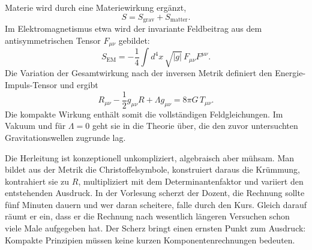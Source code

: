 Materie wird durch eine Materiewirkung ergänzt,
\begin{equation}
 S=S_{\mathrm{grav}}+S_{\mathrm{matter}}.
\end{equation}
Im Elektromagnetismus etwa wird der invariante Feldbeitrag aus dem antisymmetrischen Tensor \(F_{\mu\nu}\) gebildet:
\begin{equation}
 S_{\mathrm{EM}}
 =-\frac14
 \int d^4x\,\sqrt{|g|}\,
 F_{\mu\nu}F^{\mu\nu}.
\end{equation}
Die Variation der Gesamtwirkung nach der inversen Metrik definiert den Energie-Impuls-Tensor und ergibt
\begin{equation}
 R_{\mu\nu}
 -\frac12 g_{\mu\nu}R
 +\Lambda g_{\mu\nu}
 =8\pi G\,T_{\mu\nu}.
 \label{eq:einstein-from-action}
\end{equation}
Die kompakte Wirkung enthält somit die vollständigen Feldgleichungen. Im Vakuum und für \(\Lambda=0\) geht sie in die Theorie über, die den zuvor untersuchten Gravitationswellen zugrunde lag.

\begin{classroomqa}
\end{classroomqa}

Die Herleitung ist konzeptionell unkompliziert, algebraisch aber mühsam. Man bildet aus der Metrik die Christoffelsymbole, konstruiert daraus die Krümmung, kontrahiert sie zu \(R\), multipliziert mit dem Determinantenfaktor und variiert den entstehenden Ausdruck. In der Vorlesung scherzt der Dozent, die Rechnung sollte fünf Minuten dauern und wer daran scheitere, falle durch den Kurs. Gleich darauf räumt er ein, dass er die Rechnung nach wesentlich längeren Versuchen schon viele Male aufgegeben hat. Der Scherz bringt einen ernsten Punkt zum Ausdruck: Kompakte Prinzipien müssen keine kurzen Komponentenrechnungen bedeuten.

\begin{classroomqa}
\end{classroomqa}

